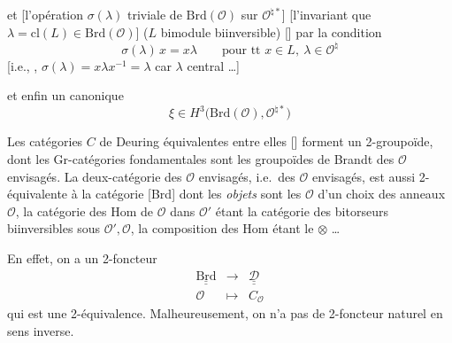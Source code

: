 \documentclass[11pt,a4paper]{article}
\begin{document}
et  \struck{\ill{}} [l'opération $\sigma(\lambda)$ triviale de $\mathrm{Brd}(\mathcal{O})$
sur $\mathcal{O}^{\natural *}$]  [l'invariant que $\lambda = \mathrm{cl}(L)
\in \mathrm{Brd}(\mathcal{O})$]  ($L$ bimodule biinversible) \struck{\ill{}}
[] par la condition
\[
  \sigma(\lambda)\, x = x \lambda \qquad \text{pour tt } x \in L, \ \lambda \in \mathcal{O}^{\natural}
\]
[i.e., , $\sigma(\lambda) = x \lambda x^{-1} = \lambda$ car $\lambda$ central …]

et enfin un  canonique
\[
  \xi \in H^{3}\bigl(\mathrm{Brd}(\mathcal{O}), \mathcal{O}^{\natural *}\bigr)
\]

Les catégories $C$ de Deuring équivalentes entre elles [] forment un
 2-groupoïde, dont les \struck{\ill{}} Gr-catégories fondamentales sont les
groupoïdes de Brandt des $\mathcal{O}$ envisagés. La deux-catégorie \ill{} des $\mathcal{O}$ envisagés,
i.e.\ des $\mathcal{O}$ envisagés, est aussi 2-équivalente à la catégorie \struck{\ill{}} [Brd] dont les
\emph{objets} sont les $\mathcal{O}$ \struck{\ill{}} d'un choix des \struck{\ill{}} anneaux $\mathcal{O}$,
 la catégorie des $\mathrm{Hom}$ de $\mathcal{O}$ dans $\mathcal{O}'$ étant la
catégorie des bitorseurs biinversibles sous $\mathcal{O}', \mathcal{O}$, la composition des
$\mathrm{Hom}$ étant le $\otimes$ …

En effet, on a un \struck{\ill{}} 2-foncteur
\[
  \begin{array}{ccc}
    \underline{\underline{\mathrm{Brd}}} & \longrightarrow & \underline{\underline{\mathcal{D}}} \\
    \mathcal{O} & \longmapsto & C_{\mathcal{O}}
  \end{array}
\]
qui est une 2-équivalence. Malheureusement, on n'a pas de 2-foncteur naturel en sens inverse.
\end{document}
